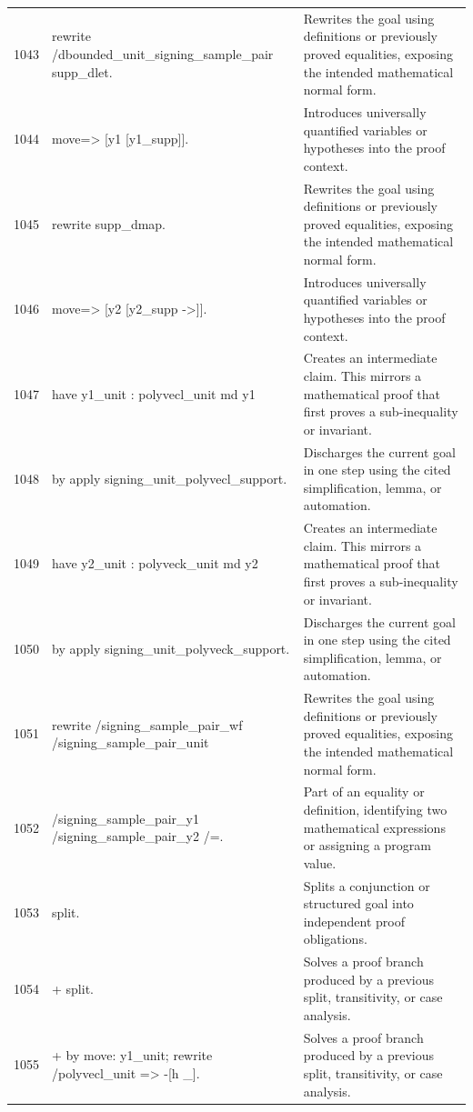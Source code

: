\documentclass[10pt]{article}
\begin{document}
\begin{longtable}{r L{0.53\textwidth} L{0.37\textwidth}}
1043 & {\ttfamily\scriptsize rewrite /dbounded\_unit\_signing\_sample\_pair supp\_dlet.} & Rewrites the goal using definitions or previously proved equalities, exposing the intended mathematical normal form. \\
1044 & {\ttfamily\scriptsize move=> [y1 [y1\_supp]].} & Introduces universally quantified variables or hypotheses into the proof context. \\
1045 & {\ttfamily\scriptsize rewrite supp\_dmap.} & Rewrites the goal using definitions or previously proved equalities, exposing the intended mathematical normal form. \\
1046 & {\ttfamily\scriptsize move=> [y2 [y2\_supp ->]].} & Introduces universally quantified variables or hypotheses into the proof context. \\
1047 & {\ttfamily\scriptsize have y1\_unit : polyvecl\_unit md y1} & Creates an intermediate claim.  This mirrors a mathematical proof that first proves a sub-inequality or invariant. \\
1048 & {\ttfamily\scriptsize   by apply signing\_unit\_polyvecl\_support.} & Discharges the current goal in one step using the cited simplification, lemma, or automation. \\
1049 & {\ttfamily\scriptsize have y2\_unit : polyveck\_unit md y2} & Creates an intermediate claim.  This mirrors a mathematical proof that first proves a sub-inequality or invariant. \\
1050 & {\ttfamily\scriptsize   by apply signing\_unit\_polyveck\_support.} & Discharges the current goal in one step using the cited simplification, lemma, or automation. \\
1051 & {\ttfamily\scriptsize rewrite /signing\_sample\_pair\_wf /signing\_sample\_pair\_unit} & Rewrites the goal using definitions or previously proved equalities, exposing the intended mathematical normal form. \\
1052 & {\ttfamily\scriptsize         /signing\_sample\_pair\_y1 /signing\_sample\_pair\_y2 /=.} & Part of an equality or definition, identifying two mathematical expressions or assigning a program value. \\
1053 & {\ttfamily\scriptsize split.} & Splits a conjunction or structured goal into independent proof obligations. \\
1054 & {\ttfamily\scriptsize + split.} & Solves a proof branch produced by a previous split, transitivity, or case analysis. \\
1055 & {\ttfamily\scriptsize   + by move: y1\_unit; rewrite /polyvecl\_unit => -[h \_].} & Solves a proof branch produced by a previous split, transitivity, or case analysis. \\

\end{longtable}
\end{document}
